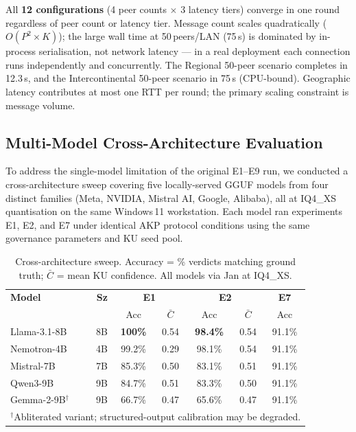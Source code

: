 \documentclass[10pt,twocolumn]{article}
\begin{document}
All \textbf{12 configurations} (4 peer counts $\times$ 3 latency tiers) converge
in one round regardless of peer count or latency tier. Message count scales
quadratically ($O(P^2 \times K)$); the large wall time at 50\,peers/LAN
(75\,s) is dominated by in-process serialisation, not network latency — in a
real deployment each connection runs independently and concurrently. The
Regional 50-peer scenario completes in 12.3\,s, and the Intercontinental
50-peer scenario in 75\,s (CPU-bound). Geographic latency contributes at
most one RTT per round; the primary scaling constraint is message volume.

\subsection{Multi-Model Cross-Architecture Evaluation}
\label{sec:multimodel}

To address the single-model limitation of the original E1--E9 run, we
conducted a cross-architecture sweep covering five locally-served GGUF
models from four distinct families (Meta, NVIDIA, Mistral AI, Google,
Alibaba), all at IQ4\_XS quantisation on the same Windows\,11 workstation.
Each model ran experiments E1, E2, and E7 under identical AKP protocol
conditions using the same governance parameters and KU seed pool.

\begin{table}[h]
\centering
\footnotesize
\setlength{\tabcolsep}{3pt}
\caption{Cross-architecture sweep. Accuracy = \% verdicts matching ground
  truth; $\bar{C}$ = mean KU confidence. All models via Jan at IQ4\_XS.}
\label{tab:multimodel}
\begin{tabular}{lrccccc}
\toprule
\textbf{Model} & \textbf{Sz} &
\multicolumn{2}{c}{\textbf{E1}} &
\multicolumn{2}{c}{\textbf{E2}} &
\textbf{E7} \\
& & Acc & $\bar{C}$ & Acc & $\bar{C}$ & Acc \\
\midrule
Llama-3.1-8B         & 8B & \textbf{100\%} & 0.54 & \textbf{98.4\%} & 0.54 & 91.1\% \\
Nemotron-4B          & 4B & 99.2\%  & 0.29 & 98.1\%  & 0.54 & 91.1\% \\
Mistral-7B           & 7B & 85.3\%  & 0.50 & 83.1\%  & 0.51 & 91.1\% \\
Qwen3-9B             & 9B & 84.7\%  & 0.51 & 83.3\%  & 0.50 & 91.1\% \\
Gemma-2-9B$^\dagger$ & 9B & 66.7\%  & 0.47 & 65.6\%  & 0.47 & 91.1\% \\
\bottomrule
\multicolumn{7}{p{7.5cm}}{$^\dagger$Abliterated variant; structured-output calibration may be degraded.}
\end{tabular}
\end{table}
\end{document}
